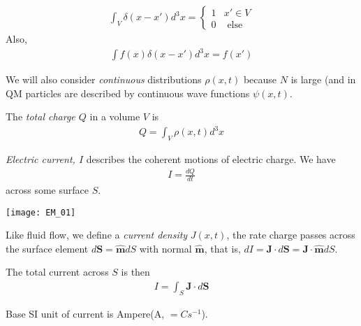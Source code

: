 \documentclass[a4paper]{article}
\begin{document}
\begin{equation*}\tag{1.4} \label{eq:1.4}
\begin{aligned}
\int_V \delta(x-x') d^3 x = \left\{\begin{array}{ll}
1 & x' \in V\\
0 & \text{ else}
\end{array}\right.
\end{aligned}
\end{equation*}
Also,
\begin{equation*}\tag{1.5} \label{eq:1.5}
\begin{aligned}
\int f(x) \delta(x-x') d^3 x = f(x')
\end{aligned}
\end{equation*}

We will also consider \emph{continuous} distributions $\rho(x,t)$ because $N$ is large (and in QM particles are described by continuous wave functions $\psi(x,t)$.

The \emph{total charge $Q$} in a volume $V$ is
\begin{equation*}\tag{1.6} \label{eq:1.6}
\begin{aligned}
Q = \int_V \rho(x,t) d^3 x
\end{aligned}
\end{equation*}

\emph{Electric current, $I$} describes the coherent motions of electric charge. We have
\begin{equation*}\tag{1.7} \label{eq:1.7}
\begin{aligned}
I = \frac{dQ}{dt}
\end{aligned}
\end{equation*}
across some surface $S$.

\texttt{[image: EM\_01]}

Like fluid flow, we define a \emph{current density} $J(x,t)$, the rate charge passes across the surface element $d\mathbf{S} = \hat{\mathbf{m}} dS$ with normal $\hat{\mathbf{m}}$, that is, $dI = \mathbf{J} \cdot d\mathbf{S} = \mathbf{J} \cdot \hat{\mathbf{m}} dS$.

The total current across $S$ is then
\begin{equation*}\tag{1.8} \label{eq:1.8}
\begin{aligned}
I = \int_S \mathbf{J} \cdot d\mathbf{S}
\end{aligned}
\end{equation*}

Base SI unit of current is Ampere(A, $=Cs^{-1}$).
\end{document}
